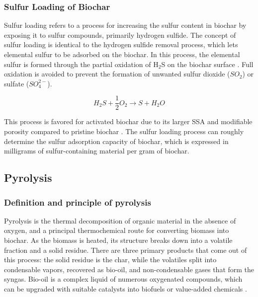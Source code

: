 \subsubsection{Sulfur Loading of Biochar}
\label{subsec:lit-sulfur-loading}
Sulfur loading refers to a process for increasing the sulfur content in biochar by exposing it to sulfur compounds, primarily hydrogen sulfide. The concept of sulfur loading is identical to the hydrogen sulfide removal process, which lets elemental sulfur to be adsorbed on the biochar. In this process, the elemental sulfur is formed through the partial oxidation of H$_2$S on the biochar surface \cite{Lin2025H2SOxidationPETBiochar}. Full oxidation is avoided to prevent the formation of unwanted sulfur dioxide ($SO_2$) or sulfate ($SO_4^{2-}$).

\begin{equation}
H_2S + \frac{1}{2}O_2 \rightarrow S + H_2O
\end{equation}

This process is favored for activated biochar due to its larger SSA and modifiable porosity compared to pristine biochar \cite{Lin2025H2SOxidationPETBiochar}. The sulfur loading process can roughly determine the sulfur adsorption capacity of biochar, which is expressed in milligrams of sulfur-containing material per gram of biochar.

\subsection{Pyrolysis}
\subsubsection{Definition and principle of pyrolysis}
Pyrolysis is the thermal decomposition of organic material in the absence of oxygen, and a principal thermochemical route for converting biomass into biochar. As the biomass is heated, its structure breaks down into a volatile fraction and a solid residue. There are three primary products that come out of this process: the solid residue is the char, while the volatiles split into condensable vapors, recovered as bio-oil, and non-condensable gases that form the syngas. Bio-oil is a complex liquid of numerous oxygenated compounds, which can be upgraded with suitable catalysts into biofuels or value-added chemicals \cite{Dufour2016}.

